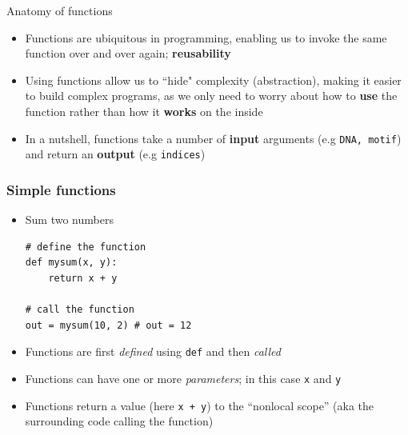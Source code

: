 \documentclass[xcolor=table]{beamer}
\begin{document}
\begin{frame}{Anatomy of functions}

\begin{itemize}\addtolength{\itemsep}{0.5\baselineskip}
	\item<1-> Functions are ubiquitous in programming, enabling us to invoke the same
	function over and over again; \textbf{reusability}

	\item<2-> Using functions allow us to ``hide" complexity (abstraction), 
	making it easier to build complex programs, as we only need to 
	worry about how to \textbf{use} the function rather than how it \textbf{works}
	on the inside

	\item<3-> In a nutshell, functions take a number of \textbf{input} arguments
	(e.g \texttt{DNA, motif}) and return an \textbf{output} (e.g \texttt{indices})
\end{itemize}
\vfill
\begin{center}
\end{center}

\end{frame}

\begin{frame}[fragile]
\frametitle{Simple functions}

\begin{itemize}[leftmargin=*]
\item<1->Sum two numbers
\begin{lstlisting}[style=python]
# define the function
def mysum(x, y):
    return x + y

# call the function
out = mysum(10, 2) # out = 12
\end{lstlisting}
    \item<2->Functions are first \emph{defined} using \texttt{def} and then \emph{called}
    \item<3->Functions can have one or more \emph{parameters}; in this case \texttt{x} and \texttt{y} 
    \item<4->Functions return a value (here \texttt{x + y}) to the ``nonlocal scope'' (aka the surrounding code calling the function)
\end{itemize}
\end{frame}
\end{document}
